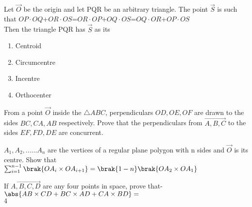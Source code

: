          \item %
		 Let $\vec{O}$ be the origin and let PQR be an arbitrary triangle. The point $\vec{S}$ is such that $OP\cdot OQ$+$OR\cdot OS$=$OR\cdot OP$+$OQ\cdot OS$=$OQ\cdot OR$+$OP\cdot OS$\\
Then the triangle PQR has $\vec{S}$ as its \hfill{}\\
\begin{enumerate}
        \item Centroid                             
        \item Circumcentre                           
        \item Incentre            
        \item Orthocenter\\          
\end{enumerate}
\item From a point $\vec{O}$ inside the $\triangle ABC$, perpendiculars $OD, OE, OF$ are drawn to the sides $BC, CA, AB$ respectively. Prove that the perpendiculars from $\vec{A,B,C}$ to the sides $EF, FD, DE$ are concurrent. \hfill{}
	\item $A_1,A_2,......A_n$ are the vertices of a regular plane polygon with n sides and $\vec{O}$ is its centre. Show that
	$\sum_{i=1}^{n-1}\brak{OA_i\times OA_{i+1}}= \brak{1-n}\brak{OA_2\times OA_1}$
		\hfill{}\\
	\item If $\vec{A,B,C,D}$ are any four points in space, prove that-
		$\abs{AB\times CD+ BC\times AD+CA\times BD}=$\\ $4$  \hfill{}\\
